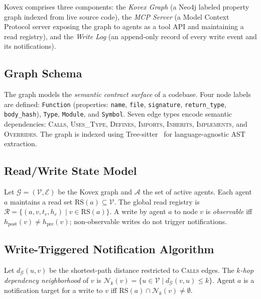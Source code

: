 \documentclass[12pt]{article}
\begin{document}
Kovex comprises three components: the \emph{Kovex Graph} (a Neo4j labeled
property graph indexed from live source code), the \emph{MCP Server} (a
Model Context Protocol server exposing the graph to agents as a tool API and
maintaining a read registry), and the \emph{Write Log} (an append-only record
of every write event and its notifications).

\subsection{Graph Schema}

The graph models the \emph{semantic contract surface} of a codebase. Four
node labels are defined: \texttt{Function} (properties: \texttt{name},
\texttt{file}, \texttt{signature}, \texttt{return\_type}, \texttt{body\_hash}),
\texttt{Type}, \texttt{Module}, and \texttt{Symbol}. Seven edge types encode
semantic dependencies: \textsc{Calls}, \textsc{Uses\_Type}, \textsc{Defines},
\textsc{Imports}, \textsc{Inherits}, \textsc{Implements}, and \textsc{Overrides}.
The graph is indexed using Tree-sitter~\cite{utkin2022parsers} for
language-agnostic AST extraction.

\subsection{Read/Write State Model}

Let $\mathcal{G} = (\mathcal{V}, \mathcal{E})$ be the Kovex graph and
$\mathcal{A}$ the set of active agents. Each agent $a$ maintains a read set
$\mathrm{RS}(a) \subseteq \mathcal{V}$. The global read registry is
$\mathcal{R} = \{(a, v, t_r, h_r) \mid v \in \mathrm{RS}(a)\}$. A write by
agent $a$ to node $v$ is \emph{observable} iff $h_{\mathrm{post}}(v) \neq
h_{\mathrm{pre}}(v)$; non-observable writes do not trigger notifications.

\subsection{Write-Triggered Notification Algorithm}

\begin{kovexdef}[title={Definition~1: $k$-Hop Notification Radius}]
Let $d_{\mathcal{G}}(u,v)$ be the shortest-path distance restricted to
\textsc{Calls} edges. The \emph{$k$-hop dependency neighborhood} of $v$ is
$\mathcal{N}_k(v) = \{u \in \mathcal{V} \mid d_{\mathcal{G}}(v,u) \leq k\}$.
Agent $a$ is a notification target for a write to $v$ iff
$\mathrm{RS}(a) \cap \mathcal{N}_k(v) \neq \emptyset$.
\end{kovexdef}
\end{document}

